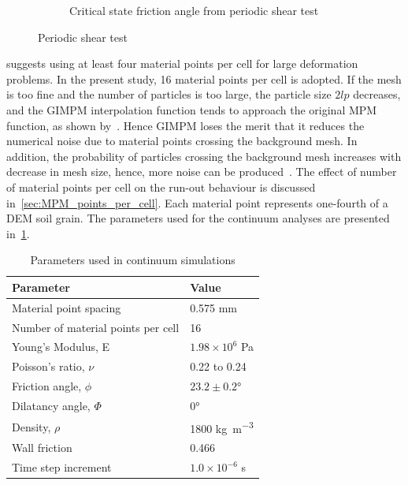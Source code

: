 \begin{figure}
\begin{subfigure}[b]{0.575\textwidth}
\caption{Critical state friction angle from periodic shear test}
\label{fig:Sxy_vs_Syy}
\end{subfigure} 
\caption{Periodic shear test}
\label{fig:shear_test}
\end{figure}

\citet{Guilkey2003} suggests using at least four material points per cell for 
large deformation problems. In the present study, 16 material points 
per cell is adopted. If the mesh is too fine and the number of particles is too 
large, the particle size $2lp$ decreases, and the GIMPM interpolation 
function 
tends to approach the original MPM function, as shown 
by~\citet{Bardenhagen2004}. Hence GIMPM loses the merit that it reduces the 
numerical noise due to material points crossing the background mesh. In 
addition, the probability of particles crossing the background mesh increases 
with decrease in mesh size, hence, more noise can be produced~\cite{Abe2013}. 
The effect of number of material points per cell on the run-out behaviour is 
discussed in~\cref{sec:MPM_points_per_cell}. Each material point represents 
one-fourth of a DEM soil grain. The parameters used for the continuum analyses 
are presented in~\cref{table:MPMData}. 

\begin{table}
\caption{Parameters used in continuum simulations}
\label{table:MPMData}
\centering
\begin{tabular}{ll}
\toprule
\textbf{Parameter} & \textbf{Value} \\ \midrule
Material point spacing & 0.575 \si{\mm} \\
Number of material points per cell & 16 \\
Young's Modulus, E & $1.98 \times 10 ^{6}$ \si{\Pa} \\
Poisson's ratio, $\nu$ & 0.22 to 0.24 \\ 
Friction angle, $\phi$ & $23.2 \pm 0.2\si{\degree}$ \\
Dilatancy angle, $\varPhi$ & $0$\si{\degree} \\
Density, $\rho$ & 1800 \si{\kg\per\m\cubed}\\
Wall friction & 0.466 \\
Time step increment & $1.0 \times 10^{-6}$ \si{\second}\\ \bottomrule
\end{tabular}
\end{table}


